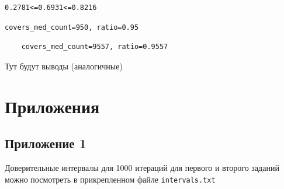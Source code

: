 \documentclass[a4paper, 12pt]{article}
\begin{document}
    \begin{lstlisting}[label=int2, caption={int2}]
    0.2781<=0.6931<=0.8216
    \end{lstlisting}


    \begin{lstlisting}[label=covers2_1000, caption={covers}]
    covers_med_count=950, ratio=0.95
    \end{lstlisting}


    \begin{lstlisting}
    covers_med_count=9557, ratio=0.9557
    \end{lstlisting}


    Тут будут выводы (аналогичные)


    \section{Приложения}
    \subsection{Приложение 1}
    Доверительные интервалы для 1000 итераций для первого и второго заданий можно посмотреть в прикрепленном файле \texttt{intervals.txt}
\end{document}
